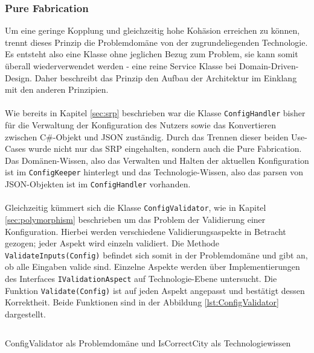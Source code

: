 \subsubsection{Pure Fabrication}\label{sec:pureFabrication}
Um eine geringe Kopplung und gleichzeitig hohe Kohäsion erreichen zu können, trennt dieses Prinzip die Problemdomäne von der zugrundeliegenden Technologie.
Es entsteht also eine Klasse ohne jeglichen Bezug zum Problem, sie kann somit überall wiederverwendet werden - eine reine Service Klasse bei Domain-Driven-Design.
Daher beschreibt das Prinzip den Aufbau der Architektur im Einklang mit den anderen Prinzipien.\\
\\
Wie bereits in Kapitel \ref{sec:srp} beschrieben war die Klasse \texttt{ConfigHandler} bisher für die Verwaltung der Konfiguration des Nutzers sowie das Konvertieren zwischen C\#-Objekt und JSON zuständig. Durch das Trennen dieser beiden Use-Cases wurde nicht nur das SRP eingehalten, sondern auch die Pure Fabrication. Das Domänen-Wissen, also das Verwalten und Halten der aktuellen Konfiguration ist im \texttt{ConfigKeeper} hinterlegt und das Technologie-Wissen, also das parsen von JSON-Objekten ist im \texttt{ConfigHandler} vorhanden.\\
\\
Gleichzeitig kümmert sich die Klasse \texttt{ConfigValidator}, wie in Kapitel \ref{sec:polymorphism} beschrieben um das Problem der Validierung einer Konfiguration.
Hierbei werden verschiedene Validierungsaspekte in Betracht gezogen; jeder Aspekt wird einzeln validiert.
Die Methode \texttt{ValidateInputs(Config)} befindet sich somit in der Problemdomäne und gibt an, ob alle Eingaben valide sind.
Einzelne Aspekte werden über Implementierungen des Interfaces \texttt{IValidationAspect} auf Technologie-Ebene untersucht. 
Die Funktion \texttt{Validate(Config)} ist auf jeden Aspekt angepasst und bestätigt dessen Korrektheit.
Beide Funktionen sind in der Abbildung \ref{lst:ConfigValidator} dargestellt.

\begin{listing}[htb]
	\inputminted[linenos=true,frame=lines]{csharp}{Listings/ConfigValidator.cs}
	\caption{ConfigValidator als Problemdomäne und IsCorrectCity als Technologiewissen}
	\label{lst:ConfigValidator}
\end{listing}


